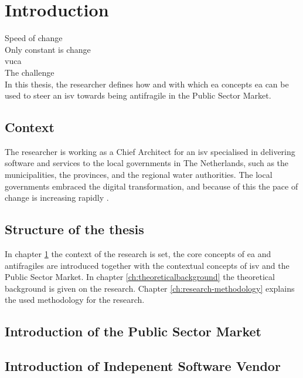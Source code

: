 \chapter{Introduction}
\label{ch:introduction}
Speed of change\\
Only constant is change\\

\acrfull{vuca}\\
The challenge\\

In this thesis, the researcher defines how and with which \acrfull{ea} concepts \acrshort{ea} can be used to steer an \acrfull{isv} towards being \gls{antifragile} in the Public Sector Market.

\section{Context}
\label{sec:context}
The researcher is working as a Chief Architect for an \acrshort{isv} specialised in delivering software and services to the local governments in The Netherlands, such as the municipalities, the provinces, and the regional water authorities. The local governments embraced the digital transformation, and because of this the pace of change is increasing rapidly \needsref. 

\section{Structure of the thesis}
\label{sec:structure}
In chapter \ref{ch:introduction} the context of the research is set, the core concepts of \acrshort{ea} and \glspl{antifragile} are introduced together with the contextual concepts of \acrshort{isv} and the Public Sector Market. In chapter \ref{ch:theoreticalbackground} the theoretical background is given on the research. Chapter \ref{ch:research-methodology} explains the used methodology for the research.

\section{Introduction of the Public Sector Market}
\label{sec:intropublicsector}

\section{Introduction of Indepenent Software Vendor}
\label{sec:introisv}

